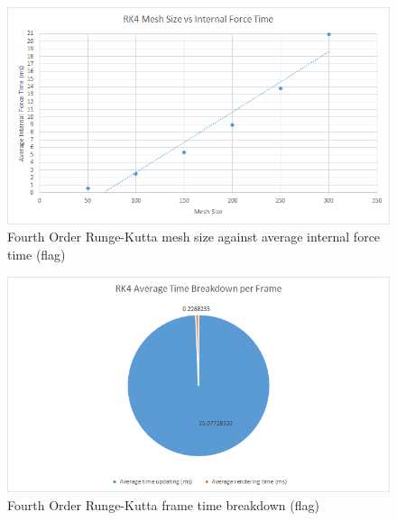     \begin{figure}
    \begin{center}
      \includegraphics[scale=.9]{Figures/flag_rk4_m_csf}
    \end{center}
    \caption{Fourth Order Runge-Kutta mesh size against average internal force time (flag)}
    \label{fig:rk4 mesh csf flag}
  \end{figure}
  
    \begin{figure}
    \begin{center}
      \includegraphics[scale=.9]{Figures/flag_rk4_ft}
    \end{center}
    \caption{Fourth Order Runge-Kutta frame time breakdown (flag)}
    \label{fig:rk4 ft flag}
  \end{figure}
  
